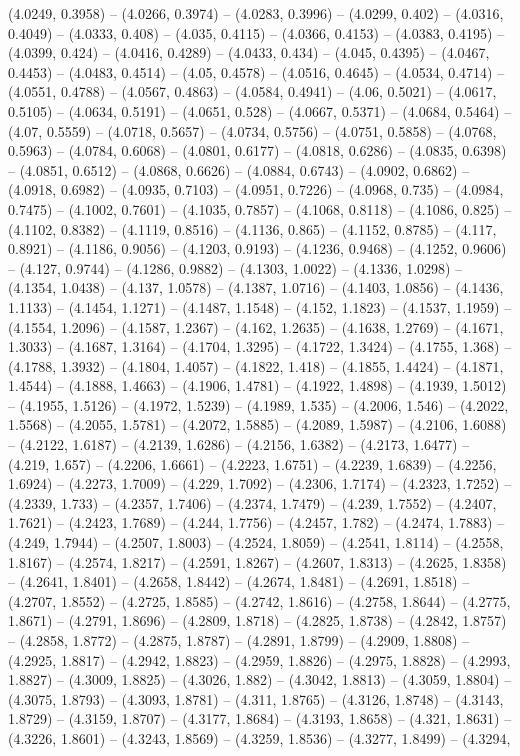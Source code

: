 (4.0249, 0.3958) -- (4.0266, 0.3974) -- (4.0283, 0.3996) -- (4.0299, 0.402) -- (4.0316, 0.4049) -- (4.0333, 0.408) -- (4.035, 0.4115) -- (4.0366, 0.4153) -- (4.0383, 0.4195) -- (4.0399, 0.424) -- (4.0416, 0.4289) -- (4.0433, 0.434) -- (4.045, 0.4395) -- (4.0467, 0.4453) -- (4.0483, 0.4514) -- (4.05, 0.4578) -- (4.0516, 0.4645) -- (4.0534, 0.4714) -- (4.0551, 0.4788) -- (4.0567, 0.4863) -- (4.0584, 0.4941) -- (4.06, 0.5021) -- (4.0617, 0.5105) -- (4.0634, 0.5191) -- (4.0651, 0.528) -- (4.0667, 0.5371) -- (4.0684, 0.5464) -- (4.07, 0.5559) -- (4.0718, 0.5657) -- (4.0734, 0.5756) -- (4.0751, 0.5858) -- (4.0768, 0.5963) -- (4.0784, 0.6068) -- (4.0801, 0.6177) -- (4.0818, 0.6286) -- (4.0835, 0.6398) -- (4.0851, 0.6512) -- (4.0868, 0.6626) -- (4.0884, 0.6743) -- (4.0902, 0.6862) -- (4.0918, 0.6982) -- (4.0935, 0.7103) -- (4.0951, 0.7226) -- (4.0968, 0.735) -- (4.0984, 0.7475) -- (4.1002, 0.7601) -- (4.1035, 0.7857) -- (4.1068, 0.8118) -- (4.1086, 0.825) -- (4.1102, 0.8382) -- (4.1119, 0.8516) -- (4.1136, 0.865) -- (4.1152, 0.8785) -- (4.117, 0.8921) -- (4.1186, 0.9056) -- (4.1203, 0.9193) -- (4.1236, 0.9468) -- (4.1252, 0.9606) -- (4.127, 0.9744) -- (4.1286, 0.9882) -- (4.1303, 1.0022) -- (4.1336, 1.0298) -- (4.1354, 1.0438) -- (4.137, 1.0578) -- (4.1387, 1.0716) -- (4.1403, 1.0856) -- (4.1436, 1.1133) -- (4.1454, 1.1271) -- (4.1487, 1.1548) -- (4.152, 1.1823) -- (4.1537, 1.1959) -- (4.1554, 1.2096) -- (4.1587, 1.2367) -- (4.162, 1.2635) -- (4.1638, 1.2769) -- (4.1671, 1.3033) -- (4.1687, 1.3164) -- (4.1704, 1.3295) -- (4.1722, 1.3424) -- (4.1755, 1.368) -- (4.1788, 1.3932) -- (4.1804, 1.4057) -- (4.1822, 1.418) -- (4.1855, 1.4424) -- (4.1871, 1.4544) -- (4.1888, 1.4663) -- (4.1906, 1.4781) -- (4.1922, 1.4898) -- (4.1939, 1.5012) -- (4.1955, 1.5126) -- (4.1972, 1.5239) -- (4.1989, 1.535) -- (4.2006, 1.546) -- (4.2022, 1.5568) -- (4.2055, 1.5781) -- (4.2072, 1.5885) -- (4.2089, 1.5987) -- (4.2106, 1.6088) -- (4.2122, 1.6187) -- (4.2139, 1.6286) -- (4.2156, 1.6382) -- (4.2173, 1.6477) -- (4.219, 1.657) -- (4.2206, 1.6661) -- (4.2223, 1.6751) -- (4.2239, 1.6839) -- (4.2256, 1.6924) -- (4.2273, 1.7009) -- (4.229, 1.7092) -- (4.2306, 1.7174) -- (4.2323, 1.7252) -- (4.2339, 1.733) -- (4.2357, 1.7406) -- (4.2374, 1.7479) -- (4.239, 1.7552) -- (4.2407, 1.7621) -- (4.2423, 1.7689) -- (4.244, 1.7756) -- (4.2457, 1.782) -- (4.2474, 1.7883) -- (4.249, 1.7944) -- (4.2507, 1.8003) -- (4.2524, 1.8059) -- (4.2541, 1.8114) -- (4.2558, 1.8167) -- (4.2574, 1.8217) -- (4.2591, 1.8267) -- (4.2607, 1.8313) -- (4.2625, 1.8358) -- (4.2641, 1.8401) -- (4.2658, 1.8442) -- (4.2674, 1.8481) -- (4.2691, 1.8518) -- (4.2707, 1.8552) -- (4.2725, 1.8585) -- (4.2742, 1.8616) -- (4.2758, 1.8644) -- (4.2775, 1.8671) -- (4.2791, 1.8696) -- (4.2809, 1.8718) -- (4.2825, 1.8738) -- (4.2842, 1.8757) -- (4.2858, 1.8772) -- (4.2875, 1.8787) -- (4.2891, 1.8799) -- (4.2909, 1.8808) -- (4.2925, 1.8817) -- (4.2942, 1.8823) -- (4.2959, 1.8826) -- (4.2975, 1.8828) -- (4.2993, 1.8827) -- (4.3009, 1.8825) -- (4.3026, 1.882) -- (4.3042, 1.8813) -- (4.3059, 1.8804) -- (4.3075, 1.8793) -- (4.3093, 1.8781) -- (4.311, 1.8765) -- (4.3126, 1.8748) -- (4.3143, 1.8729) -- (4.3159, 1.8707) -- (4.3177, 1.8684) -- (4.3193, 1.8658) -- (4.321, 1.8631) -- (4.3226, 1.8601) -- (4.3243, 1.8569) -- (4.3259, 1.8536) -- (4.3277, 1.8499) -- (4.3294, 